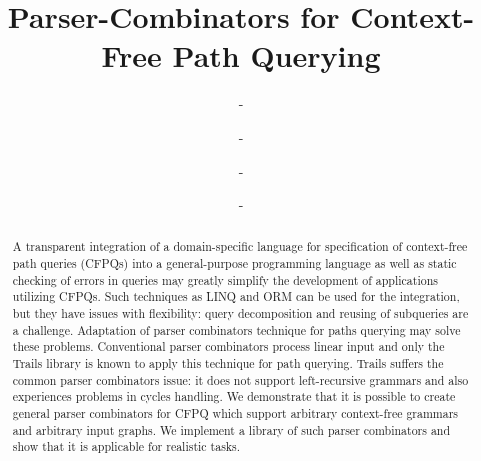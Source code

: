 \documentclass[sigconf]{acmart}
\begin{document}
\title{Parser-Combinators for Context-Free Path Querying}


\author{-}%
\affiliation{%
  \institution{-}%
  \streetaddress{-}%
  \city{-}%
  \country{-}%
  \postcode{-}%
}
\email{-}%

\author{-}%
\affiliation{%
  \institution{-}%
  \streetaddress{-}%
  \city{-}%
  \country{-}%
  \postcode{-}%
}
\email{-}%

\author{-}%
\affiliation{%
  \institution{-}%
  \streetaddress{-}%
  \city{-}%
  \country{-}%
  \postcode{-}%
}
\email{-}%

\author{-}%
\orcid{-}%
\affiliation{%
  \institution{-}%
  \streetaddress{-}%
  \city{-}%
  \country{-}%
  \postcode{-}%
}
\email{-}%

\renewcommand{\shortauthors}{-}%

\begin{abstract}
A transparent integration of a domain-specific language for specification of context-free path queries (CFPQs) into a general-purpose programming language as well as static checking of errors in queries may greatly simplify the development of applications utilizing CFPQs.  
Such techniques as LINQ and ORM can be used for the integration, but they have issues with flexibility: query decomposition and reusing of subqueries are a challenge.
Adaptation of parser combinators technique for paths querying may solve these problems. 
Conventional parser combinators process linear input and only the Trails library is known to apply this technique for path querying.
Trails suffers the common parser combinators issue: it does not support left-recursive grammars and also experiences problems in cycles handling.
We demonstrate that it is possible to create general parser combinators for CFPQ which support arbitrary context-free grammars and arbitrary input graphs.
We implement a library of such parser combinators and show that it is applicable for realistic tasks.
\end{abstract}
\end{document}
